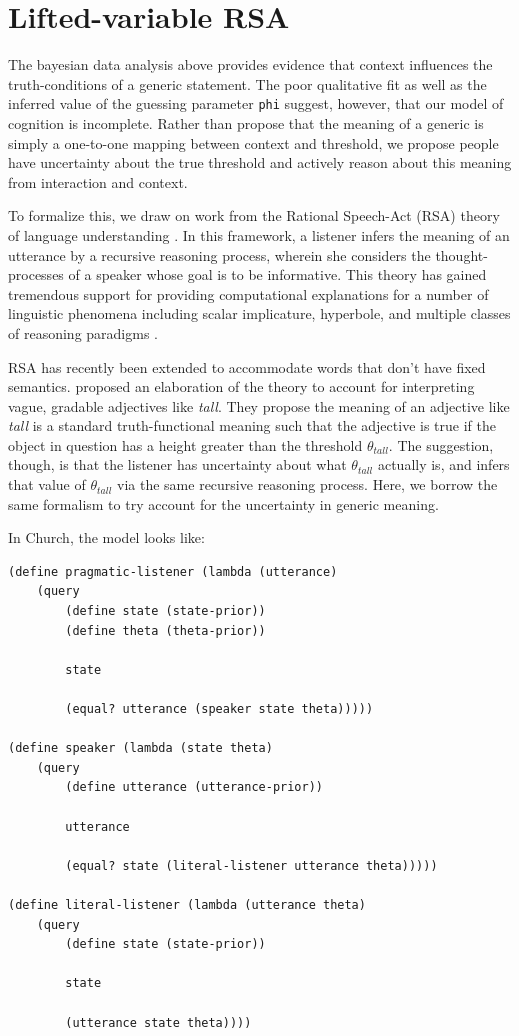 \documentclass[10pt,letterpaper]{article}
\begin{document}

\section{Lifted-variable RSA}

The bayesian data analysis above provides evidence that context influences the truth-conditions of a generic statement. The poor qualitative fit as well as the inferred value of the guessing parameter \lstinline{phi} suggest, however, that our model of cognition is incomplete. Rather than propose that the meaning of a generic is simply a one-to-one mapping between context and threshold, we propose people have uncertainty about the true threshold and actively reason about this meaning from interaction and context. 

To formalize this, we draw on work from the Rational Speech-Act (RSA) theory of language understanding \cite{Frank2012}. In this framework, a listener infers the meaning of an utterance by a recursive reasoning process, wherein she considers the thought-processes of a speaker whose goal is to be informative. This theory has gained tremendous support for providing computational explanations for a number of linguistic phenomena including scalar implicature, hyperbole, and multiple classes of reasoning paradigms \cite{Goodman2013, Kao2014, Tessler2014, Lassiter2014}. 

RSA has recently been extended to accommodate words that don't have fixed semantics.  proposed an elaboration of the theory to account for interpreting vague, gradable adjectives like \emph{tall}. They propose the meaning of an adjective like \emph{tall} is a standard truth-functional meaning such that the adjective is true if the object in question has a height greater than the threshold $\theta_{tall}$. The suggestion, though, is that the listener has uncertainty about what $\theta_{tall}$ actually is, and infers that value of $\theta_{tall}$ via the same recursive reasoning process. Here, we borrow the same formalism to try account for the uncertainty in generic meaning.

In Church, the model looks like:

\begin{lstlisting}
(define pragmatic-listener (lambda (utterance)
	(query
		(define state (state-prior))
		(define theta (theta-prior))
			
		state
			
		(equal? utterance (speaker state theta)))))
			
(define speaker (lambda (state theta)
	(query
		(define utterance (utterance-prior))
			
		utterance
			
		(equal? state (literal-listener utterance theta)))))
			
(define literal-listener (lambda (utterance theta)
	(query
		(define state (state-prior))
			
		state
			
		(utterance state theta))))
\end{lstlisting}
\end{document}
